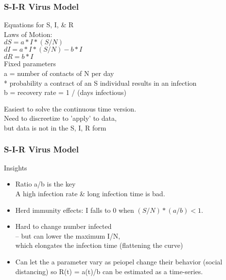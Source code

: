 \documentclass{beamer}
\begin{document}
\begin{frame}
	\frametitle{S-I-R Virus Model}
	
	
{\large Equations for S, I, \& R} \\

Laws of Motion:\\

	$ dS =  a * I * (S/N) $ \\

	$ dI = a * I * (S/N)   - b * I $ \\
	
	$ dR = b * I $ \\
	
{\small
Fixed parameters\\
	a = number of contacts of N per day \\  \hspace{.30in} * probability a contract of an S individual results in an infection \\	
	b = recovery rate  = 1 / (days infectious)\\
}

\medskip
Easiest to solve the continuous time version.\\
Need to discreetize to 'apply' to data,\\
 but data is not in the S, I, R form 
	
\end{frame}

\begin{frame}
	\frametitle{S-I-R Virus Model}
	
	Insights
	\begin{itemize}
		\item Ratio a/b is the key \\
		A high infection rate  \& long infection time is bad.  
		\item Herd immunity effects: I falls to 0 when $(S/N) * (a/b) < 1$. 
		\item Hard to change number infected \\
		-- but can lower the maximum I/N, \\
		which elongates the infection time (flattening the curve)
		\item 
		Can let the a parameter vary as peiopel change their behavior (social distancing) so R(t) = a(t)/b can be estimated as a time-series.  
	\end{itemize}
	
	
\end{frame}
\end{document}
